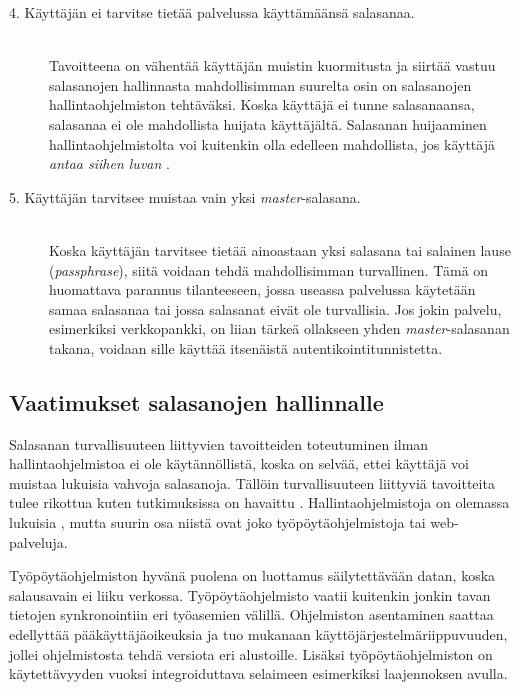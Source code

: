 \documentclass[english,gradu]{tktltiki}
\begin{document}
\begin{description}
           \item[4. Käyttäjän ei tarvitse tietää palvelussa käyttämäänsä salasanaa.] \hfill \\
             Tavoitteena on vähentää käyttäjän muistin kuormitusta ja siirtää vastuu salasanojen hallinnasta
             mahdollisimman suurelta osin on salasanojen hallintaohjelmiston tehtäväksi.
             Koska käyttäjä ei tunne salasanaansa, salasanaa ei ole mahdollista huijata käyttäjältä.
             Salasanan huijaaminen hallintaohjelmistolta voi kuitenkin olla edelleen mahdollista, jos käyttäjä
             \emph{antaa siihen luvan} \cite{why_phishing_works_06}.

           \item[5. Käyttäjän tarvitsee muistaa vain yksi \emph{master}-salasana.] \hfill \\
             Koska käyttäjän tarvitsee tietää ainoastaan yksi salasana tai salainen lause (\emph{passphrase}), siitä
             voidaan tehdä mahdollisimman turvallinen. Tämä on huomattava parannus tilanteeseen, jossa useassa palvelussa
             käytetään samaa salasanaa tai jossa salasanat eivät ole turvallisia. Jos jokin palvelu, esimerkiksi
             verkkopankki, on liian tärkeä ollakseen yhden \emph{master}-salasanan takana, voidaan sille käyttää
             itsenäistä autentikointitunnistetta.

         \end{description}


\subsection{Vaatimukset salasanojen hallinnalle}
           \label{sec:goals_for_pw_management}

         Salasanan turvallisuuteen liittyvien tavoitteiden toteutuminen ilman hallintaohjelmistoa ei ole käytännöllistä, koska on selvää, ettei käyttäjä voi muistaa lukuisia vahvoja salasanoja. Tällöin turvallisuuteen liittyviä tavoitteita tulee rikottua kuten tutkimuksissa on havaittu \cite{study_of_passwords_07, password_management_strategies_06}. Hallintaohjelmistoja on olemassa lukuisia \cite{dunn_password_managers_08}, mutta suurin osa niistä ovat joko työpöytäohjelmistoja tai web-palveluja.

         Työpöytäohjelmiston hyvänä puolena on luottamus säilytettävään datan, koska salausavain ei liiku verkossa. Työpöytäohjelmisto vaatii kuitenkin jonkin tavan tietojen synkronointiin eri työasemien välillä. Ohjelmiston asentaminen saattaa edellyttää pääkäyttäjäoikeuksia ja tuo mukanaan käyttöjärjestelmäriippuvuuden, jollei ohjelmistosta tehdä versiota eri alustoille. Lisäksi työpöytäohjelmiston on käytettävyyden vuoksi integroiduttava selaimeen esimerkiksi laajennoksen avulla.
\end{document}
